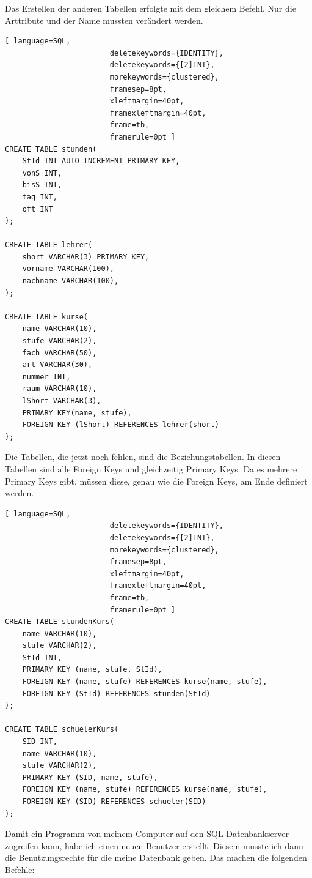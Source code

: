 \documentclass[a4paper, 12pt]{article}
\theoremstyle{plain}
\theoremstyle{definition}
\begin{document}
Das Erstellen der anderen Tabellen erfolgte mit dem gleichem Befehl. Nur die Arttribute und der Name mussten verändert werden.

	\begin{lstlisting}[ language=SQL,
	                    deletekeywords={IDENTITY},
	                    deletekeywords={[2]INT},
	                    morekeywords={clustered},
	                    framesep=8pt,
	                    xleftmargin=40pt,
	                    framexleftmargin=40pt,
	                    frame=tb,
	                    framerule=0pt ]
CREATE TABLE stunden(
	StId INT AUTO_INCREMENT PRIMARY KEY, 
	vonS INT, 
	bisS INT, 
	tag INT, 
	oft INT
);

CREATE TABLE lehrer(
	short VARCHAR(3) PRIMARY KEY,
	vorname VARCHAR(100), 
	nachname VARCHAR(100),
);

CREATE TABLE kurse(
	name VARCHAR(10), 
	stufe VARCHAR(2), 
	fach VARCHAR(50), 
	art VARCHAR(30),
	nummer INT,
	raum VARCHAR(10), 
	lShort VARCHAR(3), 
	PRIMARY KEY(name, stufe), 
	FOREIGN KEY (lShort) REFERENCES lehrer(short)
);\end{lstlisting}
Die Tabellen, die jetzt noch fehlen, sind die Beziehungstabellen. In diesen Tabellen sind alle Foreign Keys und gleichzeitig Primary Keys. Da es mehrere Primary Keys gibt, müssen diese, genau wie die Foreign Keys, am Ende definiert werden.
	
		\begin{lstlisting}[ language=SQL,
	                    deletekeywords={IDENTITY},
	                    deletekeywords={[2]INT},
	                    morekeywords={clustered},
	                    framesep=8pt,
	                    xleftmargin=40pt,
	                    framexleftmargin=40pt,
	                    frame=tb,
	                    framerule=0pt ]
CREATE TABLE stundenKurs(
	name VARCHAR(10), 
	stufe VARCHAR(2), 
	StId INT, 
	PRIMARY KEY (name, stufe, StId),
	FOREIGN KEY (name, stufe) REFERENCES kurse(name, stufe), 
	FOREIGN KEY (StId) REFERENCES stunden(StId)
);

CREATE TABLE schuelerKurs(
	SID INT, 
	name VARCHAR(10), 
	stufe VARCHAR(2),
	PRIMARY KEY (SID, name, stufe),
	FOREIGN KEY (name, stufe) REFERENCES kurse(name, stufe), 
	FOREIGN KEY (SID) REFERENCES schueler(SID)
);\end{lstlisting}
Damit ein Programm von meinem Computer auf den SQL-Datenbankserver zugreifen kann, habe ich einen neuen Benutzer erstellt. Diesem musste ich dann die Benutzungsrechte für die meine Datenbank geben. Das machen die folgenden Befehle:
	
\end{document}
